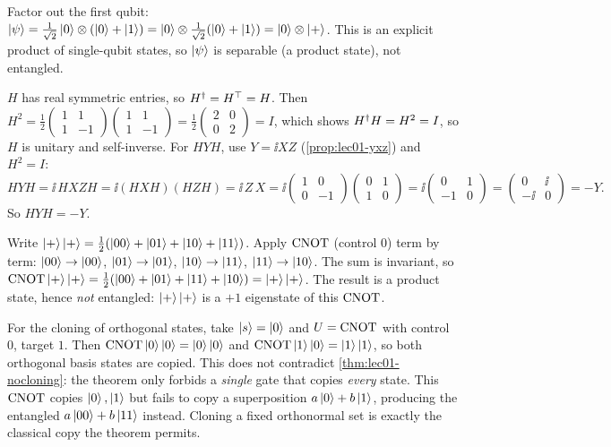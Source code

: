 \begin{solution}
Factor out the first qubit:
$\ket{\psi}=\tfrac{1}{\sqrt2}\ket{0}\otimes(\ket{0}+\ket{1})
=\ket{0}\otimes\tfrac{1}{\sqrt2}(\ket{0}+\ket{1})=\ket{0}\otimes\ket{+}$.
This is an explicit product of single-qubit states, so $\ket{\psi}$ is separable (a
product state), not entangled.
\end{solution}

\begin{solution}
$H$ has real symmetric entries, so $H^{\dagger}=H^{\top}=H$. Then
$H^{2}=\tfrac12\left(\begin{smallmatrix}1&1\\1&-1\end{smallmatrix}\right)
\left(\begin{smallmatrix}1&1\\1&-1\end{smallmatrix}\right)
=\tfrac12\left(\begin{smallmatrix}2&0\\0&2\end{smallmatrix}\right)=I$, which shows
$H^{\dagger} H=H^{2}=I$, so $H$ is unitary and self-inverse. For $HYH$, use $Y=\ii XZ$
(\cref{prop:lec01-yxz}) and $H^{2}=I$:
\[
  HYH=\ii\,H X Z H = \ii(HXH)(HZH)=\ii\,Z\,X
     = \ii\begin{pmatrix}1&0\\0&-1\end{pmatrix}
       \begin{pmatrix}0&1\\1&0\end{pmatrix}
     = \ii\begin{pmatrix}0&1\\-1&0\end{pmatrix}
     = \begin{pmatrix}0&\ii\\-\ii&0\end{pmatrix}=-Y.
\]
So $HYH=-Y$.
\end{solution}

\begin{solution}
Write $\ket{+}\ket{+}=\tfrac12(\ket{00}+\ket{01}+\ket{10}+\ket{11})$. Apply $\mathrm{CNOT}$
(control $0$) term by term: $\ket{00}\to\ket{00}$, $\ket{01}\to\ket{01}$,
$\ket{10}\to\ket{11}$, $\ket{11}\to\ket{10}$. The sum is invariant, so
$\mathrm{CNOT}\ket{+}\ket{+}=\tfrac12(\ket{00}+\ket{01}+\ket{11}+\ket{10})=\ket{+}\ket{+}$.
The result is a product state, hence \emph{not} entangled: $\ket{+}\ket{+}$ is a
$+1$ eigenstate of this $\mathrm{CNOT}$.

For the cloning of orthogonal states, take $\ket{s}=\ket{0}$ and $U=\mathrm{CNOT}$ with
control $0$, target $1$. Then $\mathrm{CNOT}\ket{0}\ket{0}=\ket{0}\ket{0}$ and
$\mathrm{CNOT}\ket{1}\ket{0}=\ket{1}\ket{1}$, so both orthogonal basis states are copied.
This does not contradict \cref{thm:lec01-nocloning}: the theorem only forbids a
\emph{single} gate that copies \emph{every} state. This $\mathrm{CNOT}$ copies
$\ket{0},\ket{1}$ but fails to copy a superposition $a\ket{0}+b\ket{1}$, producing the
entangled $a\ket{00}+b\ket{11}$ instead. Cloning a fixed orthonormal set is exactly
the classical copy the theorem permits.
\end{solution}

